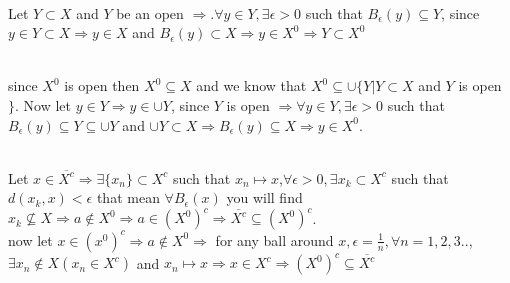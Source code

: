\documentclass{book}
\begin{document}
\begin{tcolorbox}
{\color{red}{(g)-If $Y$ is an open subset of $M$ such that $Y\subset X\subset M$, 
then $Y\subset X^0$.}}\\
Let $Y\subset X$ and $Y$ be an open $\Rightarrow.\forall y\in Y,\exists\epsilon>0$ 
such that $B_\epsilon(y)\subseteq Y$, since $y\in Y\subset X\Rightarrow y\in X$ and 
$B_\epsilon (y)\subset X\Rightarrow y\in X^0\Longrightarrow Y\subset X^0$

{}\\
since $X^0$ is open then $X^0\subseteq X$ and we know that $X^0\subseteq
\cup \{Y|Y\subset X$ and $Y$ is open $\}$. Now let $y\in Y\Rightarrow y\in \cup Y$, since $Y$ is open 
$\Rightarrow\forall y\in Y,\exists\epsilon>0$ such that 
$B_\epsilon(y)\subseteq Y\subseteq\cup Y$ and $\cup Y\subset 
X\Rightarrow B_\epsilon(y)\subseteq X\Rightarrow y\in X^0$.

{}\\
Let $x\in \overline{X^c}\Rightarrow\exists\{x_n\}\subset X^c$ such that $x_n\mapsto 
x$,$\forall\epsilon>0,\exists x_k\subset X^c$ such that
$d(x_k,x)<\epsilon$ that mean $\forall B_\epsilon(x)$ you will find $x_k\nsubseteq X\Rightarrow a\notin 
X^0\Rightarrow a\in (X^0)^c\Rightarrow \overline{X^c}\subseteq(X^0)^c$.\\
now let $x\in (x^0)^c\Rightarrow a\notin X^0\Rightarrow$ for any ball around $x,\epsilon=\frac{1}{n},\forall 
n=1,2,3..$, $\exists x_n\notin X(x_n \in X^c)$ and $x_n\mapsto x\Rightarrow x\in X^c\Rightarrow (X^0)^c\subseteq
\overline{X^c}$
\end{tcolorbox}
\end{document}
